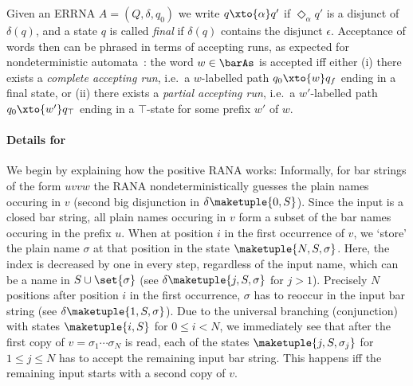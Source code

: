 \documentclass[10pt, final, conference, a4paper, twocolumn]{IEEEtran}
\renewcommand{\enquote}[1]{`#1'}
\begin{document}
\begin{rem}\label{rem:ernna}
Given an ERRNA $A=(Q,\delta,q_0)$ we write $q\xto{\alpha} q'$ if $\Diamond_\alpha q'$ is a disjunct of $\delta(q)$, and a state $q$ is called \emph{final} if $\delta(q)$ contains the disjunct $\epsilon$. Acceptance of words then can be phrased in terms of accepting runs, as expected for nondeterministic automata~\cite{skmw17,hms21}: the word $w\in \barAs$ is accepted iff either (i) there exists a \emph{complete accepting run}, i.e.~a $w$-labelled path $q_0\xto{w} q_f$ ending in a final state, or (ii) there exists a \emph{partial accepting run}, i.e.~a $w'$-labelled path $q_0\xto{w'} q_\top$ ending in a $\top$-state for some prefix $w'$ of $w$.
\end{rem}


\paragraph*{Details for }

We begin by explaining how the positive RANA works: Informally, for bar strings of the form $uvvw$ the RANA nondeterministically guesses the plain names occuring in $v$ (second big disjunction in $\delta\maketuple{0,S}$).
Since the input is a closed bar string, all plain names occuring in $v$ form a subset of the bar names occuring in
the prefix $u$. When at position $i$ in the first occurrence of $v$, we \enquote{store} the plain name $\sigma$
at that position in the state $\maketuple{N, S, \sigma}$. Here, the index is decreased by one in every step, regardless
of the input name, which can be a name in $S \cup \set{\sigma}$ (see $\delta\maketuple{j,S,\sigma}$ for $j > 1$).
Precisely $N$ positions after position $i$ in the first occurrence, $\sigma$ has to reoccur in the input bar string
(see $\delta\maketuple{1,S,\sigma}$). Due to the universal branching (conjunction) with states $\maketuple{i,S}$
for $0 \leqslant i < N$, we immediately see that after the first copy of $v = \sigma_1\cdots\sigma_N$ is read, each
of the states $\maketuple{j,S,\sigma_j}$ for $1 \leqslant j \leqslant N$ has to accept the remaining input bar string.
This happens iff the remaining input starts with a second copy of $v$.
\end{document}
